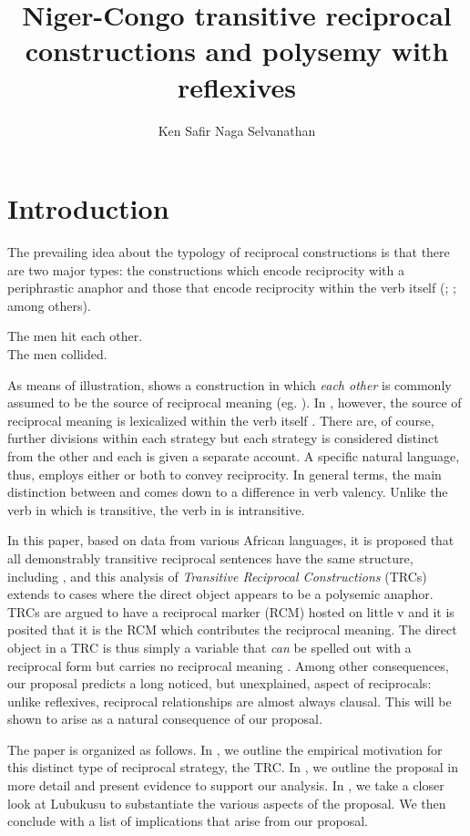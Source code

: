 \documentclass[output=paper]{langsci/langscibook}
\title{Niger-Congo transitive reciprocal constructions and polysemy with reflexives}
\author{%
Ken Safir\affiliation{Rutgers University}\lastand 
Naga Selvanathan \affiliation{Rutgers University} 
}
\begin{document}
\section{Introduction}

The prevailing idea about the typology of reciprocal constructions is that there are two major types: the constructions which encode reciprocity with a periphrastic anaphor and those that encode reciprocity within the verb itself (\citealt{KönigGast2008}; \citealt{Siloni2012}; among others).

\ea\label{ex:safir:1}
\ea\label{ex:safir:1a}
The men hit each other.  \\
\ex\label{ex:safir:1b}
The men collided.\\
\z
\z

As means of illustration,  shows a construction in which \textit{each other} is commonly assumed to be the source of reciprocal meaning (eg. \citealt{HeimEtAl1991}). In , however, the source of reciprocal meaning is lexicalized within the verb itself \citep{Siloni2012}.  There are, of course, further divisions within each strategy but each strategy is considered distinct from the other and each is given a separate account. A specific natural language, thus, employs either or both to convey reciprocity. In general terms, the main distinction between  and  comes down to a difference in verb valency. Unlike the verb in  which is transitive, the verb in  is intransitive.

In this paper, based on data from various African languages, it is proposed that all demonstrably transitive reciprocal sentences have the same structure, including , and this analysis of \textit{Transitive Reciprocal Constructions} (TRCs) extends to cases where the direct object appears to be a polysemic anaphor. TRCs are argued to have a reciprocal marker (RCM) hosted on little v and it is posited that it is the RCM which contributes the reciprocal meaning. The direct object in a TRC is thus simply a variable that \textit{can} be spelled out with a reciprocal form but carries no reciprocal meaning \citep{Safir2014}. Among other consequences, our proposal predicts a long noticed, but unexplained, aspect of reciprocals: unlike reflexives, reciprocal relationships are almost always clausal. This will be shown to arise as a natural consequence of our proposal.
 
The paper is organized as follows. In , we outline the empirical motivation for this distinct type of reciprocal strategy, the TRC. In , we outline the proposal in more detail and present evidence to support our analysis. In , we take a closer look at Lubukusu to substantiate the various aspects of the proposal. We then conclude with a list of implications that arise from our proposal.
\end{document}
